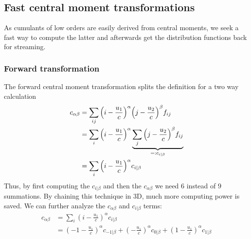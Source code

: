 \documentclass{article}
\begin{document}
\subsection{Fast central moment transformations}
\label{sub:Fast central moment transformations}

As cumulants of low orders are easily derived from central moments, we seek a fast way to compute the latter and afterwards get the distribution functions back for streaming.

\subsubsection{Forward transformation}
\label{subs:Forward transformation}

The forward central moment transformation splits the definition for a two way calculation
\begin{equation}
  \begin{aligned}
    c_{\alpha\beta}
    & = \sum_{ij} {\left(i-\frac{u_1}{c}\right)}^\alpha {\left(j-\frac{u_2}{c}\right)}^\beta f_{ij} \\
    & = \sum_{i} {\left(i-\frac{u_1}{c}\right)}^\alpha \underbrace{\sum_{j} {\left(j-\frac{u_2}{c}\right)}^\beta f_{ij}}_{\mathrel{\mathop=}: c_{i|\beta}} \\
    & = \sum_{i} {\left(i-\frac{u_1}{c}\right)}^\alpha c_{i|\beta}
  \end{aligned}
\end{equation}
Thus, by first computing the $c_{i|\beta}$ and then the $c_{\alpha\beta}$ we need $6$ instead of $9$ summations.
By chaining this technique in 3D, much more computing power is saved.
We can further analyze the $c_{\alpha\beta}$ and $c_{i|\beta}$ terms:
\begin{equation}
  \begin{aligned}
    \label{eq:fast forward c_alpha beta expanded}
    c_{\alpha\beta} & = \sum_{i} {\left(i-\frac{u_1}{c}\right)}^\alpha c_{i|\beta} \\
    & = {\left(-1-\frac{u_1}{c}\right)}^\alpha c_{-1|\beta} + {\left(-\frac{u_1}{c}\right)}^\alpha c_{0|\beta} + {\left(1-\frac{u_1}{c}\right)}^\alpha c_{1|\beta}
  \end{aligned}
\end{equation}
\end{document}
